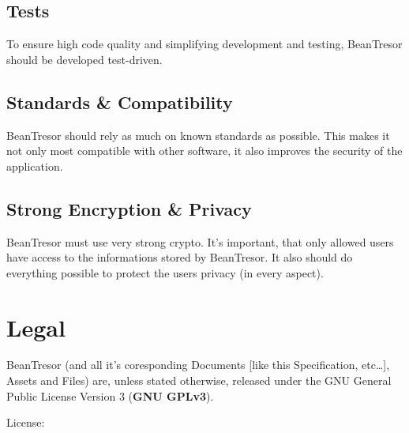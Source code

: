 \documentclass[11pt,a4paper,titlepage,portrait,english,final]{scrartcl}
\begin{document}
\subsection{Tests}
To ensure high code quality and simplifying development and testing, BeanTresor should be developed test-driven.

\subsection{Standards \& Compatibility}
BeanTresor should rely as much on known standards as possible. This makes it not only most compatible with other software, it also improves the security of the application.

\subsection{Strong Encryption \& Privacy}
BeanTresor must use very strong crypto. It's important, that only allowed users have access to the informations stored by BeanTresor. It also should do everything possible to protect the users privacy (in every aspect).

\section{Legal}
BeanTresor (and all it's coresponding Documents [like this Specification, etc\ldots], Assets and Files) are, unless stated otherwise, released under the GNU General Public License Version 3 (\textbf{GNU GPLv3}).

License:
\end{document}
